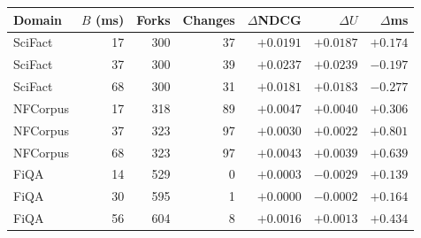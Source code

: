 \begin{tabular}{lrrrrrr}
\toprule
Domain & $B$ (ms) & Forks & Changes & $\Delta$NDCG & $\Delta U$ & $\Delta$ms \\
\midrule
SciFact & 17 & 300 & 37 & $+0.0191$ & $+0.0187$ & $+0.174$ \\
SciFact & 37 & 300 & 39 & $+0.0237$ & $+0.0239$ & $-0.197$ \\
SciFact & 68 & 300 & 31 & $+0.0181$ & $+0.0183$ & $-0.277$ \\
NFCorpus & 17 & 318 & 89 & $+0.0047$ & $+0.0040$ & $+0.306$ \\
NFCorpus & 37 & 323 & 97 & $+0.0030$ & $+0.0022$ & $+0.801$ \\
NFCorpus & 68 & 323 & 97 & $+0.0043$ & $+0.0039$ & $+0.639$ \\
FiQA & 14 & 529 & 0 & $+0.0003$ & $-0.0029$ & $+0.139$ \\
FiQA & 30 & 595 & 1 & $+0.0000$ & $-0.0002$ & $+0.164$ \\
FiQA & 56 & 604 & 8 & $+0.0016$ & $+0.0013$ & $+0.434$ \\
\bottomrule
\end{tabular}
